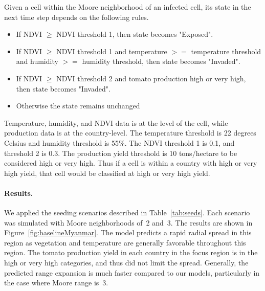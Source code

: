 \documentclass[10pt]{article}
\newcommand{\aacomment}[1]{({\color{magenta}AA: #1})}
\theoremstyle{definition}
\begin{document}
Given a cell within the Moore neighborhood of an infected cell, its state
in the next time step depends on the following rules.
\begin{itemize} 
\item If NDVI $\ge$ NDVI threshold 1, then state becomes "Exposed".
\item If NDVI $\ge$ NDVI threshold 1 and temperature $>=$ temperature threshold and humidity $>=$ humidity threshold, then state becomes "Invaded".
\item If NDVI $\ge$ NDVI threshold 2 and tomato production high or very high, then state becomes "Invaded".
\item Otherwise the state remains unchanged
\end{itemize}

Temperature, humidity, and NDVI data is at the level of the cell, while
production data is at the country-level. The temperature threshold is 22
degrees Celsius and humidity threshold is 55\%. The NDVI threshold 1 is
0.1, and threshold 2 is 0.3. The production yield threshold is 10
tons/hectare to be considered high or very high. Thus if a cell is within a
country with high or very high yield, that cell would be classified at high
or very high yield.
\paragraph{Results.}
We applied the seeding scenarios described in Table~\ref{tab:seeds}. Each
scenario was simulated with Moore neighborhoods of~2 and~3.  The results
are shown in Figure~\ref{fig:baselineMyanmar}.  The model predicts a rapid
radial spread in this region as vegetation and temperature are generally
favorable throughout this region.  The tomato production yield in each
country in the focus region is in the high or very high categories, and
thus did not limit the spread.  Generally, the predicted range expansion is
much faster compared to our models, particularly in the case where Moore
range is~3.
\end{document}
